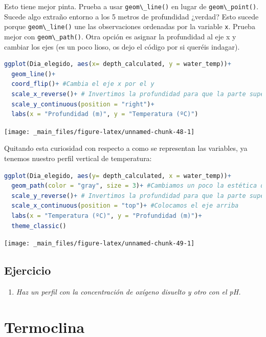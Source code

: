 \documentclass[
]{book}
\newcommand{\passthrough}[1]{#1}
\providecommand{\tightlist}{%
  \setlength{\itemsep}{0pt}\setlength{\parskip}{0pt}}
\begin{document}
Esto tiene mejor pinta. Prueba a usar \passthrough{\lstinline!geom\_line()!} en lugar de \passthrough{\lstinline!geom\_point()!}. Sucede algo extraño entorno a los 5 metros de profundidad ¿verdad? Esto sucede porque \passthrough{\lstinline!geom\_line()!} une las observaciones ordenadas por la variable \passthrough{\lstinline!x!}. Prueba mejor con \passthrough{\lstinline!geom\_path()!}. Otra opción es asignar la profundidad al eje x y cambiar los ejes (es un poco lioso, os dejo el código por si queréis indagar).

\begin{lstlisting}[language=R]
ggplot(Dia_elegido, aes(x= depth_calculated, y = water_temp))+
  geom_line()+
  coord_flip()+ #Cambia el eje x por el y
  scale_x_reverse()+ # Invertimos la profundidad para que la parte superior sea 0 metros.
  scale_y_continuous(position = "right")+
  labs(x = "Profundidad (m)", y = "Temperatura (ºC)")
\end{lstlisting}

\texttt{[image: \_main\_files/figure-latex/unnamed-chunk-48-1]}

Quitando esta curiosidad con respecto a como se representan las variables, ya tenemos nuestro perfil vertical de temperatura:

\begin{lstlisting}[language=R]
ggplot(Dia_elegido, aes(y= depth_calculated, x = water_temp))+
  geom_path(color = "gray", size = 3)+ #Cambiamos un poco la estética dándole color y grosor a la línea
  scale_y_reverse()+ # Invertimos la profundidad para que la parte superior sea 0 metros.
  scale_x_continuous(position = "top")+ #Colocamos el eje arriba
  labs(x = "Temperatura (ºC)", y = "Profundidad (m)")+
  theme_classic()
\end{lstlisting}

\texttt{[image: \_main\_files/figure-latex/unnamed-chunk-49-1]}

\hypertarget{ejercicio}{%
\subsection{Ejercicio}\label{ejercicio}}

\begin{enumerate}
\def\labelenumi{\arabic{enumi}.}
\tightlist
\item
  \emph{Haz un perfil con la concentración de oxígeno disuelto y otro con el pH.}
\end{enumerate}

\hypertarget{termoclina}{%
\section{Termoclina}\label{termoclina}}
\end{document}
